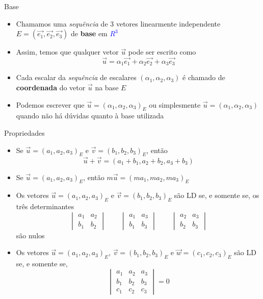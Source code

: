 \begin{frame}{Base}
    \begin{itemize}
        \item Chamamos uma \textit{sequência} de 3 vetores linearmente independente \(E=(\vec{e_1}, \vec{e_2}, \vec{e_3})\)
            de \textbf{base} em \textcolor{blue}{\(R^3\)}
        \item Assim, temos que qualquer vetor \(\vec{u}\) pode ser escrito como
            \[
                \vec{u} = \alpha_1 \vec{e_1} + \alpha_2 \vec{e_2} + \alpha_3 \vec{e_3}
            \]
        \item Cada escalar da \textit{sequência} de escalares \((\alpha_1, \alpha_2, \alpha_3)\) é chamado de
            \textbf{coordenada} do vetor \(\vec{u}\) na base \(E\)
        \item Podemos escrever que \(\vec{u} = (\alpha_1, \alpha_2, \alpha_3)_E\) ou simplesmente
            \(\vec{u} = (\alpha_1, \alpha_2, \alpha_3)\) quando não há dúvidas quanto à base utilizada
    \end{itemize}
\end{frame}

\begin{frame}{Propriedades}
    \begin{itemize}
        \item Se \(\vec{u}=(a_1,a_2,a_3)_E\) e \(\vec{v}=(b_1,b_2,b_3)_E\), então
            \[
                \vec{u}+\vec{v}=(a_1+b_1,a_2+b_2,a_3+b_3)
            \]
        \item Se \(\vec{u}=(a_1,a_2,a_3)_E\), então \(m\vec{u}=(m a_1,m a_2,m a_3)_E\)
        \item Os vetores \(\vec{u}=(a_1,a_2,a_3)_E\) e \(\vec{v}=(b_1,b_2,b_3)_E\) são LD se, e somente se,
            os três determinantes
            \[
                \begin{vmatrix}
                    a_1 & a_2 \\ b_1 & b_2
                \end{vmatrix} \qquad
                \begin{vmatrix}
                    a_1 & a_3 \\ b_1 & b_3
                \end{vmatrix} \qquad
                \begin{vmatrix}
                    a_2 & a_3 \\ b_2 & b_3
                \end{vmatrix}
            \]
            são nulos
        \item Os vetores \(\vec{u}=(a_1,a_2,a_3)_E\), \(\vec{v}=(b_1,b_2,b_3)_E\) e \(\vec{w}=(c_1,c_2,c_3)_E\) são LD se, e somente se,
            \[
                \begin{vmatrix}
                    a_1 & a_2 & a_3 \\ b_1 & b_2 & b_3 \\ c_1 & c_2 & c_3
                \end{vmatrix} = 0
            \]
    \end{itemize}
\end{frame}

